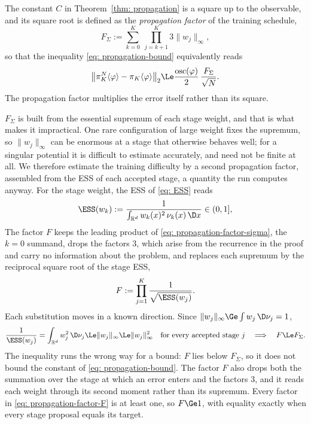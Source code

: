 \documentclass{article}
\begin{document}
The constant $C$ in Theorem~\ref{thm: propagation} is a square up to the observable, and its square root is defined as the \emph{propagation factor} of the training schedule,
\begin{equation}
    F_\Sigma
    := \sum_{k=0}^{K}\ \prod_{j=k+1}^{K} 3\lVert w_j \rVert_\infty ,
    \label{eq: propagation-factor-sigma}
\end{equation}
so that the inequality \eqref{eq: propagation-bound} equivalently reads
\begin{equation*}
    \bigl\lVert \pi_K^N\langle \varphi\rangle - \pi_K\langle \varphi\rangle \bigr\rVert_2
    \Le \frac{\operatorname{osc}(\varphi)}{2}\, \frac{F_\Sigma}{\sqrt N}.
\end{equation*}
The propagation factor multiplies the error itself rather than its square.

$F_\Sigma$ is built from the essential supremum of each stage weight, and that is what makes it impractical. One rare configuration of large weight fixes the supremum, so $\lVert w_j \rVert_\infty$ can be enormous at a stage that otherwise behaves well; for a singular potential it is difficult to estimate accurately, and need not be finite at all. We therefore estimate the training difficulty by a second propagation factor, assembled from the ESS of each accepted stage, a quantity the run computes anyway. For the stage weight, the ESS of \eqref{eq: ESS} reads
\begin{equation}
    \ESS(w_k) := \frac{1}{\int_{\mathbb R^d} w_k(x)^2 \, \nu_k(x) \, \D x} \in (0,1] ,
    \label{eq: propagation-ESS}
\end{equation}
The factor $F$ keeps the leading product of \eqref{eq: propagation-factor-sigma}, the $k=0$ summand, drops the factors $3$, which arise from the recurrence in the proof and carry no information about the problem, and replaces each supremum by the reciprocal square root of the stage ESS,
\begin{equation}
    F
    := \prod_{j=1}^{K} \frac{1}{\sqrt{\ESS(w_j)}} .
    \label{eq: propagation-factor-F}
\end{equation}
Each substitution moves in a known direction. Since $\lVert w_j \rVert_\infty \Ge \int w_j \, \D\nu_j = 1$,
\begin{equation*}
    \frac{1}{\ESS(w_j)} = \int_{\mathbb R^d} w_j^2 \, \D\nu_j \Le \lVert w_j \rVert_\infty \Le \lVert w_j \rVert_\infty^{2}
    \quad\text{for every accepted stage } j
    \quad\Longrightarrow\quad
    F \Le F_\Sigma .
\end{equation*}
The inequality runs the wrong way for a bound: $F$ lies below $F_\Sigma$, so it does not bound the constant of \eqref{eq: propagation-bound}. The factor $F$ also drops both the summation over the stage at which an error enters and the factors $3$, and it reads each weight through its second moment rather than its supremum. Every factor in \eqref{eq: propagation-factor-F} is at least one, so $F \Ge 1$, with equality exactly when every stage proposal equals its target.
\end{document}
